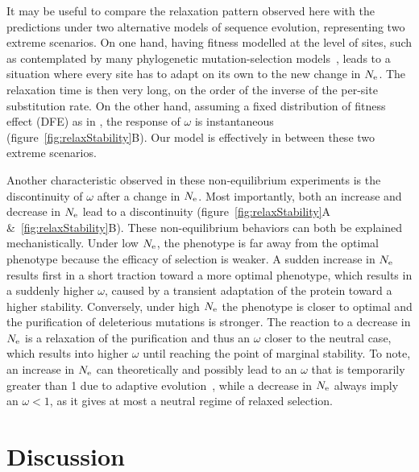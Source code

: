 It may be useful to compare the relaxation pattern observed here with the predictions under two alternative models of sequence evolution, representing two extreme scenarios.
On one hand, having fitness modelled at the level of sites, such as contemplated by many phylogenetic mutation-selection models~\citep{Halpern1998, Rodrigue2010, Tamuri2012}, leads to a situation where every site has to adapt on its own to the new change in $N_{\text{e}}$.
The relaxation time is then very long, on the order of the inverse of the per-site {substitution} rate.
On the other hand, assuming a fixed distribution of fitness effect ({DFE}) as in \citet{Welch2008}, the response of $\omega$ is instantaneous (figure~\ref{fig:relaxStability}B).
Our model is effectively in between these two extreme scenarios.

Another characteristic observed in these non-equilibrium experiments is the discontinuity of $\omega$ after a change in $N_{\text{e}}$.
Most importantly, both an increase and decrease in $N_{\text{e}}$ lead to a discontinuity (figure~\ref{fig:relaxStability}A \&~\ref{fig:relaxStability}B).
These non-equilibrium behaviors can both be explained mechanistically.
Under low $N_{\text{e}}$, the {phenotype} is far away from the optimal {phenotype} because the efficacy of selection is weaker.
A sudden increase in $N_{\text{e}}$ results first in a short traction toward a more optimal {phenotype}, which results in a suddenly higher $\omega$, caused by a transient adaptation of the protein toward a higher stability.
Conversely, under high $N_{\text{e}}$ the {phenotype} is closer to optimal and the purification of deleterious mutations is stronger.
The reaction to a decrease in $N_{\text{e}}$ is a relaxation of the purification and thus an $\omega$ closer to the {neutral} case, which results into higher $\omega$ until reaching the point of marginal stability.
To note, an increase in $N_{\text{e}}$ can theoretically and possibly lead to an $\omega$ that is temporarily greater than 1 due to adaptive evolution~\citep{Jones2016}, while a decrease in $N_{\text{e}}$ always imply an $\omega < 1$, as it gives at most a {neutral} regime of relaxed selection.


\section{Discussion}

